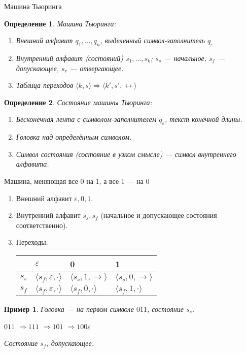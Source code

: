 \documentclass[handout]{beamer}
\newtheorem{dfn}{Определение}[section]
\newtheorem{exm}{Пример}[section]
\begin{document}
\begin{frame}{Машина Тьюринга}
\begin{dfn}Машина Тьюринга:
\begin{enumerate}
\item Внешний алфавит $q_1, \dots, q_n$, выделенный символ-заполнитель $q_\varepsilon$
\item Внутренний алфавит (состояний) $s_1, \dots, s_k$; $s_s$ --- начальное, $s_f$ --- допускающее, $s_r$ --- отвергающее.
\item Таблица переходов $\langle k, s \rangle \Rightarrow \langle k', s', \leftrightarrow \rangle$
\end{enumerate}
\end{dfn}

\begin{dfn}Состояние машины Тьюринга:
\begin{enumerate}
\item Бесконечная лента с символом-заполнителем $q_\varepsilon$, текст конечной длины.
\item Головка над определённым символом.
\item Символ состояния (состояние в узком смысле) --- символ внутреннего алфавита.
\end{enumerate}
\end{dfn}

\end{frame}

\begin{frame}{Машина, меняющая все 0 на 1, а все 1 --- на 0}
\begin{enumerate}
\item Внешний алфавит $\varepsilon, 0, 1$.
\item Внутренний алфавит $s_s, s_f$ (начальное и допускающее состояния соответственно).
\item Переходы:

\begin{tabular}{l|lll}
    & $\varepsilon$ & 0 & 1\\\hline
$s_s$ & $\langle s_f,\varepsilon,\cdot\rangle$ & $\langle s_s,1,\rightarrow\rangle$ & $\langle s_s,0,\rightarrow\rangle$\\
$s_f$ & $\langle s_f,\varepsilon,\cdot\rangle$ & $\langle s_f,0,\cdot\rangle$ & $\langle s_f,1,\cdot\rangle$
\end{tabular}
\end{enumerate}\pause

\begin{exm}
Головка --- на первом символе $011$, состояние $s_s$.\pause

$\underline{0}11$ \pause $\Rightarrow 1\underline{1}1$ \pause $\Rightarrow 10\underline{1}$ \pause $\Rightarrow 100\underline{\varepsilon}$
\pause

Состояние $s_f$, допускающее.
\end{exm}

\end{frame}
\end{document}
